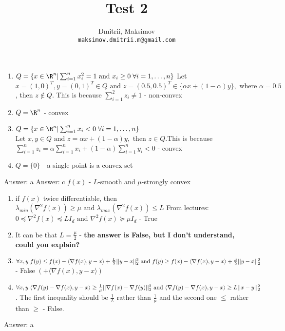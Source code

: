 \documentclass{homework}
\title{Test 2}
\author{
  Dmitrii, Maksimov\\
  \texttt{maksimov.dmitrii.m@gmail.com}
}
\begin{document}
\maketitle

\exercise
\begin{enumerate}[label=\alph*)]
	\item $Q = \{x\in\R^n|\sum_{i=1}^nx_i^2=1 \text{ and } x_i \geq0\;\forall i=1,\ldots,n\}$\newline
		Let $x = (1, 0)^T, y=(0,1)^T \in Q \text{ and } z = (0.5, 0.5)^T \in \{\alpha x + (1-\alpha)y\}, \text{ where } \alpha=0.5$, then $z \notin Q$. This is because $\sum_{i=1}^2z_i\neq1$ - non-convex
	\item $Q = \R^n$ - convex
	\item $Q = \{x\in\R^n|\sum_{i=1}^nx_i<0\;\forall i=1,\ldots,n\}$\newline
		$\text{Let } x, y \in Q \text{ and } z = \alpha x + (1-\alpha)y, \text{ then }z\in Q.$\newline This is because $\sum_{i=1}^nz_i=\alpha\sum_{i=1}^nx_i + (1-\alpha)\sum_{i=1}^ny_i < 0$ - convex
	\item $Q=\{0\}$ - a single point is a convex set
\end{enumerate}
Answer: a
\exercise*
Answer: c
\exercise*
$f(x)$ - $L$-smooth and $\mu$-strongly convex
\begin{enumerate}[label=\alph*)]
	\item if $f(x)$ twice differentiable, then $\lambda_{min}(\nabla^2f(x))\geq\mu \text{ and }\lambda_{max}(\nabla^2f(x))\leq L $ \newline From lectures: $0\preceq\nabla^2f(x)\preceq LI_d \text{ and }\nabla^2f(x)\succeq \mu I_d$ - True
	\item It can be that $L=\frac{\mu}{2}$ - \textbf{the answer is False, but I don't understand, could you explain?}
	\item $\forall x,y\;f(y)\leq f(x) - \langle \nabla f(x), y-x\rangle + \frac{L}{2}||y-x||_2^2 \newline\text{ and } f(y)\geq f(x) - \langle \nabla f(x), y-x\rangle + \frac{\mu}{2}||y-x||_2^2$ - False $(+ \langle \nabla f(x), y-x\rangle)$
	\item $\forall x,y\;\langle \nabla f(y) - \nabla f(x), y-x\rangle\geq\frac{1}{\mu}||\nabla f(x)-\nabla f(y)||_2^2 \newline\text{ and } \langle \nabla f(y) - \nabla f(x), y-x\rangle\geq L||x-y||_2^2$. The first inequality should be $\frac{1}{L}$ rather than $\frac{1}{\mu}$ and the second one $\leq$ rather than $\geq$ - False.
\end{enumerate}
Answer: a
\exercise*
{}
\end{document}
